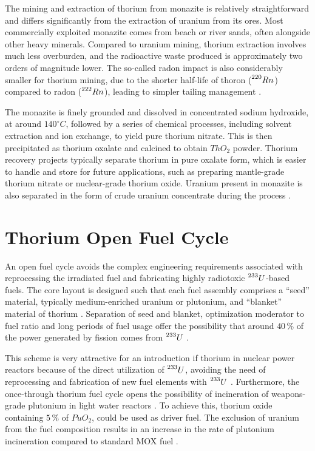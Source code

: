 The mining and extraction of thorium from monazite is relatively straightforward and differs significantly from the extraction of uranium from its ores. Most commercially exploited monazite comes from beach or river sands, often alongside other heavy minerals. Compared to uranium mining, thorium extraction involves much less overburden, and the radioactive waste produced is approximately two orders of magnitude lower. The so-called radon impact is also considerably smaller for thorium mining, due to the shorter half-life of thoron (\(\prescript{220}{}{Rn}\)) compared to radon (\(\prescript{222}{}{Rn}\)), leading to simpler tailing management \cite{IAEA_Th_Potential,Thoron}.

The monazite is finely grounded and dissolved in concentrated sodium hydroxide, at around \(140^{\circ}C\), followed by a series of chemical processes, including solvent extraction and ion exchange, to yield pure thorium nitrate. This is then precipitated as thorium oxalate and calcined to obtain \(ThO_2\) powder. Thorium recovery projects typically separate thorium in pure oxalate form, which is easier to handle and store for future applications, such as preparing mantle-grade thorium nitrate or nuclear-grade thorium oxide. Uranium present in monazite is also separated in the form of crude uranium concentrate during the process \cite{IAEA_Th_Potential}.

\section{Thorium Open Fuel Cycle}

An open fuel cycle avoids the complex engineering requirements associated with reprocessing the irradiated fuel and fabricating highly radiotoxic \(\prescript{233}{}{U}\)-based fuels. The core layout is designed such that each fuel assembly comprises a ``seed'' material, typically medium-enriched uranium or plutonium, and ``blanket'' material of thorium \cite{IAEA_Th_Potential}. Separation of seed and blanket, optimization moderator to fuel ratio and long periods of fuel usage offer the possibility that around \(40 \, \%\) of the power generated by fission comes from \(\prescript{233}{}{U}\) \cite{IAEA_Th_Potential}.

This scheme is very attractive for an introduction if thorium in nuclear power reactors because of the direct utilization of \(\prescript{233}{}{U}\), avoiding the need of reprocessing and fabrication of new fuel elements with \(\prescript{233}{}{U}\) \cite{IAEA_Th_Potential}. Furthermore, the once-through thorium fuel cycle opens the possibility of incineration of weapons-grade plutonium in light water reactors \cite{IAEA_Th_Potential}. To achieve this, thorium oxide containing \(5 \, \%\) of \(PuO_2\), could be used as driver fuel. The exclusion of uranium from the fuel composition results in an increase in the rate of plutonium incineration compared to standard MOX fuel \cite{IAEA_Th_Potential}.


